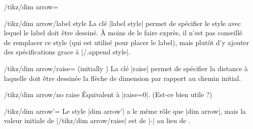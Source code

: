 \documentclass[a4paper]{ltxdoc}
\begin{document}
\begin{stylekey}{/tikz/dim arrow=}
  \begin{stylekey}{/tikz/dim arrow/label style}
  La clé |label style| permet de spécifier le style avec lequel le label doit être dessiné.
  À moins de le faire exprès, il n'est pas conseillé de remplacer ce style (qui est utilisé pour placer le label), mais plutôt d'y ajouter des spécifications grace à |/.append style|.

\begin{codeexample}[]
\end{codeexample}
  \end{stylekey}

  \begin{key}{/tikz/dim arrow/raise= (initially )}
  La clé |raise| permet de spécifier la distance  à laquelle doit être dessinée la flèche de dimension par rapport au chemin initial.
  \begin{codeexample}[]
\end{codeexample}
  \end{key}

  \begin{stylekey}{/tikz/dim arrow/no raise}
  Équivalent à |raise=0|. (Est-ce bien utile ?)
  \end{stylekey}
\end{stylekey}

\begin{stylekey}{/tikz/dim arrow'=}
  Le style |dim arrow'| a le même rôle que |dim arrow|, mais la valeur initiale de |/tikz/dim arrow/raise| est de |-|\texttt{} au lieu de \texttt{}.

\begin{codeexample}[]
\end{codeexample}
\end{stylekey}
\end{document}
